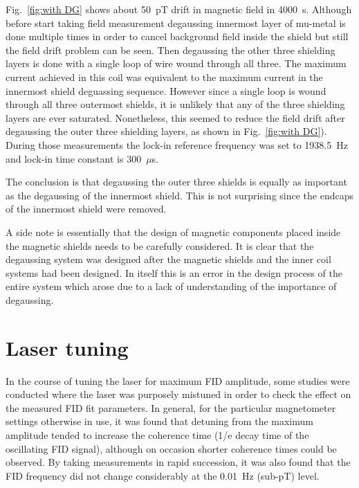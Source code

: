 Fig.~\ref{fig:with DG} shows about 50~pT drift in magnetic field in
4000~s. Although before start taking field measurement degaussing
innermost layer of mu-metal is done multiple times in order to cancel
background field inside the shield but still the field drift problem
can be seen. Then degaussing the other three shielding layers is done
with a single loop of wire wound through all three.  The maximum
current achieved in this coil was equivalent to the maximum current in
the innermost shield deguassing sequence.  However since a single loop
is wound through all three outermost shields, it is unlikely that any
of the three shielding layers are ever saturated.  Nonetheless, this
seemed to reduce the field drift after degaussing the outer three
shielding layers, as shown in Fig.~\ref{fig:with DG}). During those
measurements the lock-in reference frequency was set to 1938.5~Hz and
lock-in time constant is 300~$\mu$s.


The conclusion is that degaussing the outer three shields is equally
as important as the degaussing of the innermost shield.  This is not
surprising since the endcaps of the innermost shield were removed.

A side note is essentially that the design of magnetic components
placed inside the magnetic shields needs to be carefully considered.
It is clear that the degaussing system was designed after the magnetic
shields and the inner coil systems had been designed.  In itself this
is an error in the design process of the entire system which arose due
to a lack of understanding of the importance of degaussing.


\section{Laser tuning\label{sec:tuning}} 

In the course of tuning the laser for maximum FID amplitude, some
studies were conducted where the laser was purposely mistuned in order
to check the effect on the measured FID fit parameters.  In general,
for the particular magnetometer settings otherwise in use, it was
found that detuning from the maximum amplitude tended to increase the
coherence time (1/e decay time of the oscillating FID signal),
although on occasion shorter coherence times could be observed.  By
taking measurements in rapid succession, it was also found that the
FID frequency did not change considerably at the 0.01~Hz (sub-pT)
level.


